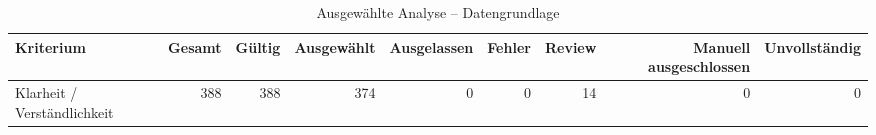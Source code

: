 \begin{table}[htbp]
\centering
\caption{Ausgewählte Analyse -- Datengrundlage}
\begin{tabular}{lrrrrrrrr}
\toprule
Kriterium & Gesamt & Gültig & Ausgewählt & Ausgelassen & Fehler & Review & Manuell ausgeschlossen & Unvollständig \\
\midrule
Klarheit / Verständlichkeit & 388 & 388 & 374 & 0 & 0 & 14 & 0 & 0 \\
\bottomrule
\end{tabular}
\end{table}
